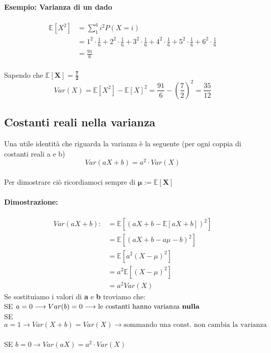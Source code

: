 \documentclass[]{article}
\newcommand{\ev}{\mathbb{E}[X]}
\renewcommand{\ev}[1]{\mathbb{E}[#1]}
\begin{document}
    \paragraph{Esempio: Varianza di un dado}
    \begin{equation*}
        \begin{split}
            \ev{X^2} & = \sum_{1}^{6} i^2 P(X = i) \\
            & = 1^2 \cdot \frac{1}{6} + 2^2 \cdot \frac{1}{6} + 3^2 \cdot \frac{1}{6} + 4^2 \cdot \frac{1}{6} + 5^2 \cdot \frac{1}{6} + 6^2 \cdot \frac{1}{6} \\
            & = \frac{91}{6}
        \end{split}
    \end{equation*} \\
    Sapendo che $\boldsymbol{\ev{X} = \frac{7}{2}}$
    \[ Var(X) = \ev{X^2} - \ev{X}^2 = \frac{91}{6} - (\frac{7}{2})^2 = \frac{35}{12} \]

    \subsection{Costanti reali nella varianza}
    Una utile identità che riguarda la varianza è la seguente (per ogni coppia di costanti reali a e b)
    \[ Var(aX + b) = a^2 \cdot Var(X) \] \\
    Per dimostrare ciò ricordiamoci sempre di $\boldsymbol{\mu := \ev{X}}$
    \paragraph{Dimostrazione:}
    \begin{equation*}
        \begin{split}
            Var(aX + b) :&= \ev{(aX + b - \ev{aX + b})^2} \\
            & = \ev{(aX + b -a\mu - b)^2} \\
            & = \ev{a^2(X-\mu)^2} \\
            & = a^2 \ev{(X - \mu)^2} \\
            & = a^2 Var(X)
        \end{split}
    \end{equation*}
    Se sostituiamo i valori di \textbf{a} e \textbf{b} troviamo che: \\
    SE $a = 0 \longrightarrow Var(b) = 0 \longrightarrow \text{le costanti hanno varianza \textbf{nulla}}$ \\
    SE $a = 1 \longrightarrow Var(X + b) = Var(X) \longrightarrow \text{sommando una const. non cambia la varianza}$ \\ \\
    SE $b = 0 \longrightarrow Var(aX) = a^2 \cdot Var(X)$ \\
    
\end{document}
